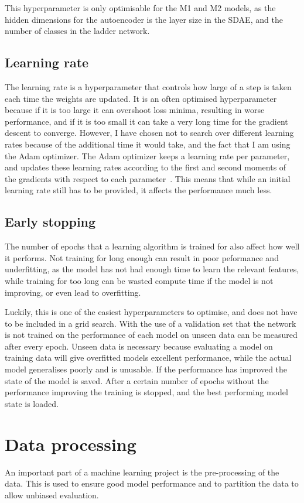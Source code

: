 This hyperparameter is only optimisable for the M1 and M2 models, as the hidden dimensions for the autoencoder is the layer size in the SDAE,
and the number of classes in the ladder network.

\subsection{Learning rate}
The learning rate is a hyperparameter that controls how large of a step is taken each time the weights are updated. It is an often
optimised hyperparameter because if it is too large it can overshoot loss minima, resulting in worse performance, and if it is too 
small it can take a very long time for the gradient descent to converge. However, I have chosen not to search over different learning 
rates because of the additional time it would take, and the fact that I am using the Adam optimizer. The Adam optimizer keeps a 
learning rate per parameter, and updates these learning rates according to the first and second moments of the gradients with respect to each 
parameter~\cite{DBLP:journals/corr/KingmaB14}. This means that while an initial learning rate still has to be provided, it affects the 
performance much less.

\subsection{Early stopping}
The number of epochs that a learning algorithm is trained for also affect how well it performs. Not training for long enough can result in
poor peformance and underfitting, as the model has not had enough time to learn the relevant features, while training for too long can
be wasted compute time if the model is not improving, or even lead to overfitting.

Luckily, this is one of the easiest hyperparameters to optimise, and does not have to be included in a grid search. 
With the use of a validation set that the network is not trained on the performance of each model on unseen data can be measured after 
every epoch. Unseen data is necessary because evaluating a model on training data will give overfitted models excellent performance, 
while the actual model generalises poorly and is unusable.
If the performance has improved the state of the model is saved. After a certain number of epochs without the performance improving 
the training is stopped, and the best performing model state is loaded.

\section{Data processing}
An important part of a machine learning project is the pre-processing of the data. This is used to ensure good model performance and 
to partition the data to allow unbiased evaluation.

